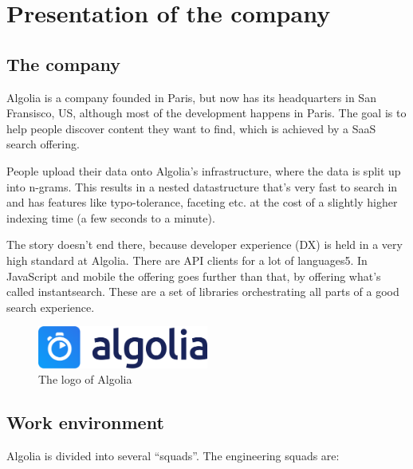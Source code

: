 
\chapter{Presentation of the company} %
\label{chp:presentation}

\section{The company} %
\label{sec:company}

Algolia\cite{algolia-home} is a company founded in Paris, but now has its headquarters in San Fransisco, US, although most of the development happens in Paris. The goal is to help people discover content they want to find, which is achieved by a SaaS search offering.

People upload their data onto Algolia’s infrastructure, where the data is split up into n-grams\cite{kimbrell1988searching}. This results in a nested datastructure that’s very fast to search in and has features like typo-tolerance, faceting etc. at the cost of a slightly higher indexing time (a few seconds to a minute).\cite{paris-nlp-algolia}

The story doesn’t end there, because developer experience (DX) is held in a very high standard at Algolia. There are API clients for a lot of languages5. In JavaScript and mobile the offering goes further than that, by offering what’s called instantsearch\cite{instantsearch-js}\cite{react-instantsearch}\cite{instantsearch-android}\cite{instantsearch-ios}. These are a set of libraries orchestrating all parts of a good search experience.

\begin{figure}[H]
  \label{figure:company-logo}
  \centering
  \includegraphics[width=0.5\textwidth]{../assets/algolia-logo-light.pdf}
  \caption{The logo of Algolia \cite{algolia-press}}
\end{figure}

\section{Work environment}
\label{sec:work-environment}

Algolia is divided into several ``squads''. The engineering squads are:

